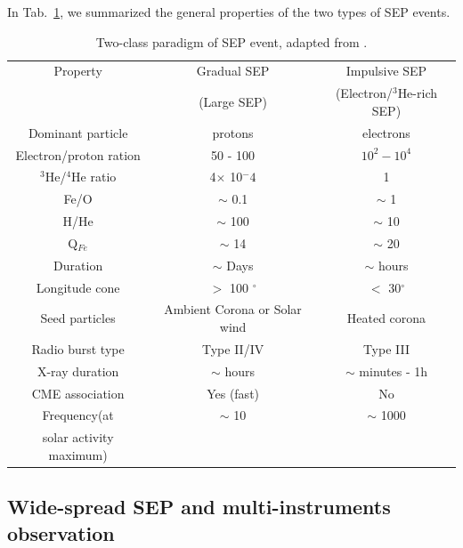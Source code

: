 In Tab.~\ref{Tab:Two_type_SEP}, we summarized the general properties of the two types of \ac{SEP} events.

\begin{table}[!h]
    \centering
    \caption[Two classes of SEP events]{Two-class paradigm of \ac{SEP} event, adapted from \citet{kallenrode2003current,Desai_Diacalone2016LRSP, Wang2009}.}
    \begin{tabular}{|c|c|c|}
        \hline
        \hline
        Property    & Gradual \ac{SEP}  & Impulsive \ac{SEP} \\
                    & (Large \ac{SEP})  & (Electron/$^3$He-rich \ac{SEP}) \\
        \hline
        Dominant particle   & protons   & electrons \\
        Electron/proton ration &  50 - 100 &  $10^2 - 10^4$  \\
        $^3$He/$^4$He ratio & 4$\times$ 10$^-4$ & 1 \\
        Fe/O            & $\sim$ 0.1            & $\sim$ 1   \\
        H/He            & $\sim$ 100            & $\sim$ 10 \\
        Q$_{Fe}$        & $\sim$ 14             & $\sim$ 20 \\
        Duration        & $\sim$ Days           & $\sim$ hours \\
        Longitude cone  & $>$ 100 $^\circ$      & $<$ 30$^\circ$ \\
        Seed particles  & Ambient Corona or Solar wind & Heated corona \\
        Radio burst type        & Type II/IV    & Type III \\
        X-ray duration  & $\sim$ hours  & $\sim$ minutes - 1h \\
        CME association & Yes (fast)    & No    \\
        Frequency(at    & $\sim$ 10 & $\sim$ 1000 \\
        solar activity maximum) &   &   \\
        \hline
    \end{tabular}
    \label{Tab:Two_type_SEP}
\end{table}


\subsection*{Wide-spread SEP and multi-instruments observation}

